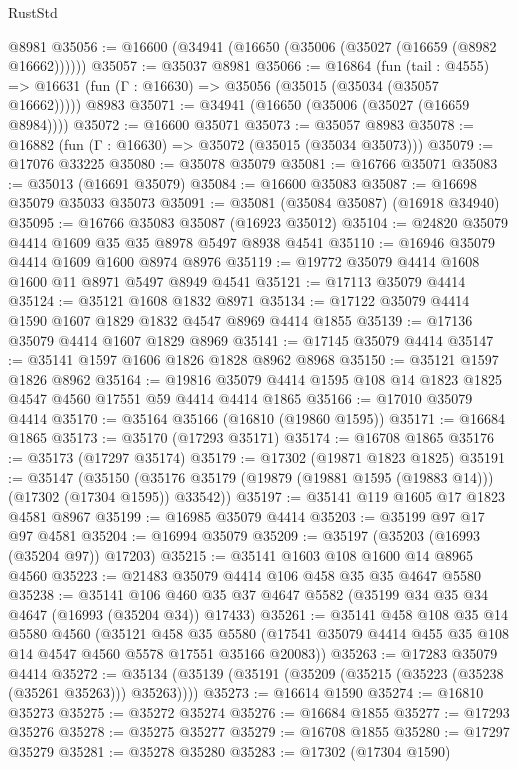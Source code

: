 \begin{lexlean}{RustStd}
\begin{coremodule}
    @8981
@35056 := @16600 (@34941 (@16650 (@35006 (@35027 (@16659 (@8982 @16662))))))
@35057 := @35037 @8981
@35066 := @16864
    (fun (tail : @4555) => @16631 (fun (Γ : @16630) => @35056 (@35015 (@35034 (@35057 @16662)))))
    @8983
@35071 := @34941 (@16650 (@35006 (@35027 (@16659 @8984))))
@35072 := @16600 @35071
@35073 := @35057 @8983
@35078 := @16882 (fun (Γ : @16630) => @35072 (@35015 (@35034 @35073)))
@35079 := @17076 @33225
@35080 := @35078 @35079
@35081 := @16766 @35071
@35083 := @35013 (@16691 @35079)
@35084 := @16600 @35083
@35087 := @16698 @35079 @35033 @35073
@35091 := @35081 (@35084 @35087) (@16918 @34940)
@35095 := @16766 @35083 @35087 (@16923 @35012)
@35104 := @24820 @35079 @4414 @1609 @35 @35 @8978 @5497 @8938 @4541
@35110 := @16946 @35079 @4414 @1609 @1600 @8974 @8976
@35119 := @19772 @35079 @4414 @1608 @1600 @11 @8971 @5497 @8949 @4541
@35121 := @17113 @35079 @4414
@35124 := @35121 @1608 @1832 @8971
@35134 := @17122 @35079 @4414 @1590 @1607 @1829 @1832 @4547 @8969 @4414 @1855
@35139 := @17136 @35079 @4414 @1607 @1829 @8969
@35141 := @17145 @35079 @4414
@35147 := @35141 @1597 @1606 @1826 @1828 @8962 @8968
@35150 := @35121 @1597 @1826 @8962
@35164 := @19816 @35079 @4414 @1595 @108 @14 @1823 @1825 @4547 @4560 @17551 @59 @4414 @4414 @1865
@35166 := @17010 @35079 @4414
@35170 := @35164 @35166 (@16810 (@19860 @1595))
@35171 := @16684 @1865
@35173 := @35170 (@17293 @35171)
@35174 := @16708 @1865
@35176 := @35173 (@17297 @35174)
@35179 := @17302 (@19871 @1823 @1825)
@35191 := @35147
    (@35150 (@35176 @35179 (@19879 (@19881 @1595 (@19883 @14))) (@17302 (@17304 @1595)) @33542))
@35197 := @35141 @119 @1605 @17 @1823 @4581 @8967
@35199 := @16985 @35079 @4414
@35203 := @35199 @97 @17 @97 @4581
@35204 := @16994 @35079
@35209 := @35197 (@35203 (@16993 (@35204 @97)) @17203)
@35215 := @35141 @1603 @108 @1600 @14 @8965 @4560
@35223 := @21483 @35079 @4414 @106 @458 @35 @35 @4647 @5580
@35238 := @35141
    @106
    @460
    @35
    @37
    @4647
    @5582
    (@35199 @34 @35 @34 @4647 (@16993 (@35204 @34)) @17433)
@35261 := @35141
    @458
    @108
    @35
    @14
    @5580
    @4560
    (@35121
      @458
      @35
      @5580
      (@17541 @35079 @4414 @455 @35 @108 @14 @4547 @4560 @5578 @17551 @35166 @20083))
@35263 := @17283 @35079 @4414
@35272 := @35134 (@35139 (@35191 (@35209 (@35215 (@35223 (@35238 (@35261 @35263))) @35263))))
@35273 := @16614 @1590
@35274 := @16810 @35273
@35275 := @35272 @35274
@35276 := @16684 @1855
@35277 := @17293 @35276
@35278 := @35275 @35277
@35279 := @16708 @1855
@35280 := @17297 @35279
@35281 := @35278 @35280
@35283 := @17302 (@17304 @1590)

\end{coremodule}
\end{lexlean}
